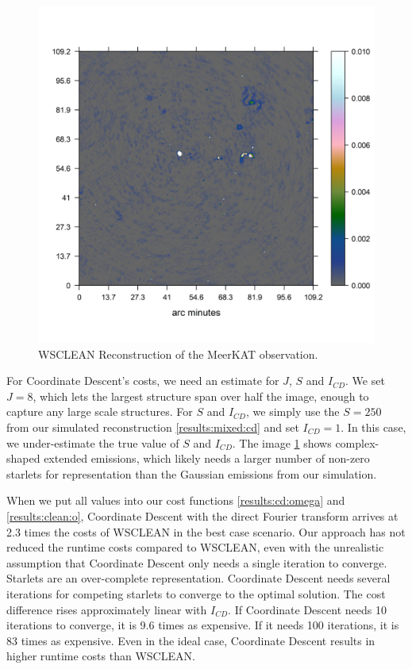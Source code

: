 \begin{figure}[h]
	\centering
	\includegraphics[width=0.8\linewidth]{./chapters/21.scalability/meerkat.png}
	\caption{WSCLEAN Reconstruction of the MeerKAT observation.}
	\label{scale:wsclean}
\end{figure}

For Coordinate Descent's costs, we need an estimate for $J$, $S$ and $I_{CD}$. We set $J=8$, which lets the largest structure span over half the image, enough to capture any large scale structures. For $S$ and $I_{CD}$, we simply use the $S=250$ from our simulated reconstruction \ref{results:mixed:cd} and set $I_{CD}=1$. In this case, we under-estimate the true value of $S$ and $I_{CD}$. The image \ref{scale:wsclean} shows complex-shaped extended emissions, which likely needs a larger number of non-zero starlets for representation than the Gaussian emissions from our simulation.

When we put all values into our cost functions \eqref{results:cd:omega} and \eqref{results:clean:o}, Coordinate Descent with the direct Fourier transform arrives at 2.3 times the costs of WSCLEAN in the best case scenario. Our approach has not reduced the runtime costs compared to WSCLEAN, even with the unrealistic assumption that Coordinate Descent only needs a single iteration to converge. Starlets are an over-complete representation. Coordinate Descent needs several iterations for competing starlets to converge to the optimal solution. The cost difference rises approximately linear with $I_{CD}$. If Coordinate Descent needs 10 iterations to converge, it is 9.6 times as expensive. If it needs 100 iterations, it is 83 times as expensive. Even in the ideal case, Coordinate Descent results in higher runtime costs than WSCLEAN.

